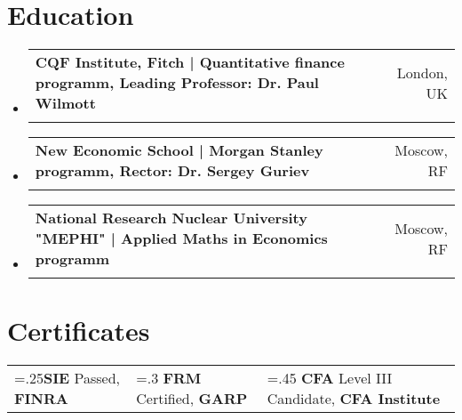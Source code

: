 \documentclass[a4paper,hidelinks]{article}
\makeatletter
\newcommand{\resumeSubheading}[4]{
  \vspace{-2pt}\item
    \begin{tabular*}{0.97\textwidth}[t]{l@{\extracolsep{\fill}}r}
      \textbf{#1} & #2 \\
      \text{\small#3} & \text{\small #4} \\
    \end{tabular*}\vspace{-7pt}
}
\newcommand{\resumeSubHeadingListStart}{\begin{itemize}[leftmargin=0.15in, label={}]}
\newcommand{\resumeSubHeadingListEnd}{\end{itemize}}
\makeatother
\begin{document}
\section{Education}
\vspace{1pt}
\resumeSubHeadingListStart
\resumeSubheading
{{CQF Institute, Fitch | Quantitative finance programm, Leading Professor: Dr. Paul Wilmott}}{London, UK}
{Quantitative Finance Charter}{Jan 2022 \textbf{--} Jul 2022}
\resumeSubheading
{{New Economic School | Morgan Stanley programm, Rector: Dr. Sergey Guriev}}{Moscow, RF}
{Master in Finance}{Sep 2013 \textbf{--} Jul 2015}
\resumeSubheading
{{National Research Nuclear University "MEPHI" | Applied Maths in Economics programm}}{Moscow, RF}
{Economist Mathematician}{Sep 2007 \textbf{--} Jul 2012}
\resumeSubHeadingListEnd


\vspace{-2pt}
\section{Certificates}
\resumeSubHeadingListStart
\small{\item{
  \begin{tabularx}{0.9\textwidth} { 
     >{\centering\arraybackslash\hsize=.25\hsize}X 
    || >{\centering\arraybackslash\hsize=.3\hsize}X 
    || >{\centering\arraybackslash\hsize=.45\hsize}X } 
    \textbf{SIE} Passed, \textbf{FINRA} &
    \textbf{FRM} Certified, \textbf{GARP} & 
    \textbf{CFA} Level III Candidate, \textbf{CFA Institute} 
  \end{tabularx}
}}
\resumeSubHeadingListEnd

\vspace{-9pt}
\end{document}
